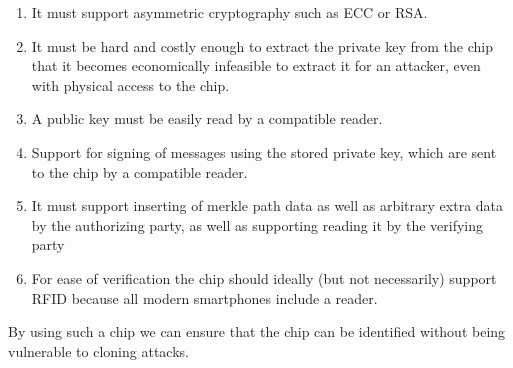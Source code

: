 \documentclass[twocolumn,titlepage]{article}
\begin{document}
\begin{enumerate}
    \item It must support asymmetric cryptography such as ECC or RSA.
    \item It must be hard and costly enough to extract the private key from the chip that it becomes economically infeasible to extract it for an attacker, even with physical access to the chip.
    \item A public key must be easily read by a compatible reader.
    \item Support for signing of messages using the stored private key, which are sent to the chip by a compatible reader.
    \item It must support inserting of merkle path data as well as arbitrary extra data by the authorizing party, as well as supporting reading it by the verifying party
    \item For ease of verification the chip should ideally (but not necessarily) support RFID because all modern smartphones include a reader.
\end{enumerate}
By using such a chip we can ensure that the chip can be identified without being vulnerable to cloning attacks.
\end{document}
